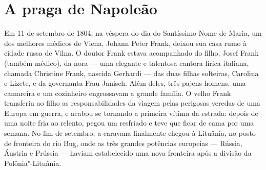 \chapter{A praga de Napoleão}

\begin{epigraphs} 
\end{epigraphs}


Em 11 de setembro de 1804, na véspera do dia do Santíssimo Nome de
Maria, um dos melhores médicos de Viena, 
Johann Peter Frank, deixou sua
casa rumo à cidade russa de Vilna. O doutor Frank estava acompanhado do
filho, Josef Frank (também médico), da nora --- uma 
elegante e talentosa cantora lírica italiana, chamada Christine Frank,
nascida Gerhardi --- das
duas filhas solteiras, Carolina e Lizete, e da governanta Frau Janisch.
Além deles, três pajens homens, uma camareira e um cozinheiro
engrossavam a grande família. O velho Frank transferiu ao filho as
responsabilidades da viagem pelas perigosas veredas de uma Europa em
guerra, e acabou se tornando a primeira vítima da estrada: depois de uma
noite fria ao relento, pegou um resfriado e teve que ficar de cama por
uma semana. No fim de setembro, a caravana finalmente chegou à Lituânia,
no posto de fronteira do rio Bug, onde as três grandes potências
europeias --- Rússia, Áustria e Prússia --- haviam estabelecido uma nova
fronteira após a divisão da Polônia"-Lituânia.


